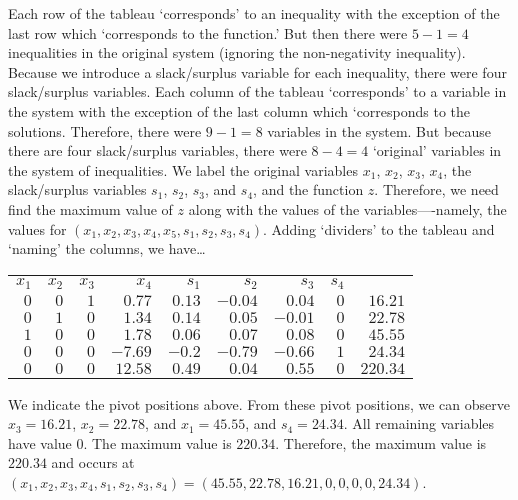 \documentclass[12pt,letterpaper]{exam}
\begin{document}
\begin{questions}
\sol Each row of the tableau `corresponds' to an inequality with the exception of the last row which `corresponds to the function.' But then there were $5 - 1= 4$ inequalities in the original system (ignoring the non-negativity inequality). Because we introduce a slack/surplus variable for each inequality, there were four slack/surplus variables. Each column of the tableau `corresponds' to a variable in the system with the exception of the last column which `corresponds to the solutions. Therefore, there were $9 - 1= 8$ variables in the system. But because there are four slack/surplus variables, there were $8 - 4= 4$ `original' variables in the system of inequalities. We label the original variables $x_1$, $x_2$, $x_3$, $x_4$, the slack/surplus variables $s_1$, $s_2$, $s_3$, and $s_4$, and the function $z$. Therefore, we need find the maximum value of $z$ along with the values of the variables----namely, the values for $(x_1, x_2, x_3, x_4, x_5, s_1, s_2, s_3, s_4)$. Adding `dividers' to the tableau and `naming' the columns, we have\dots \par
	\begin{table}[!ht]
	\centering
	\begin{tabular}{rrrrrrrr|r}
	{\scriptsize $x_1$} & {\scriptsize $x_2$} & {\scriptsize $x_3$} & {\scriptsize $x_4$} & {\scriptsize $s_1$} & {\scriptsize $s_2$} & {\scriptsize $s_3$} & {\scriptsize $s_4$} & \\
	$0$ & $0$ & $\boxed{1}$ & $0.77$ & $0.13$ & $-0.04$ & $0.04$ & $0$ & $16.21$ \\
	$0$ & $\boxed{1}$ & $0$ & $1.34$ & $0.14$ & $0.05$ & $-0.01$ & $0$ & $22.78$ \\
	$\boxed{1}$ & $0$ & $0$ & $1.78$ & $0.06$ & $0.07$ & $0.08$ & $0$ & $45.55$ \\
	$0$ & $0$ & $0$ & $-7.69$ & $-0.2$ & $-0.79$ & $-0.66$ & $\boxed{1}$ & $24.34$ \\ \hline
	$0$ & $0$ & $0$ & $12.58$ & $0.49$ & $0.04$ & $0.55$ & $0$ & $220.34$ 	
	\end{tabular}
	\end{table} \par
We indicate the pivot positions above. From these pivot positions, we can observe $x_3= 16.21$, $x_2= 22.78$, and $x_1= 45.55$, and $s_4= 24.34$. All remaining variables have value 0. The maximum value is $220.34$. Therefore, the maximum value is $220.34$ and occurs at $(x_1, x_2, x_3, x_4, s_1, s_2, s_3, s_4)= (45.55, 22.78, 16.21, 0, 0, 0, 0, 24.34)$. 
	\[
	\boxed{
	\begin{gathered}

\end{gathered}}\]
\end{questions}
\end{document}
